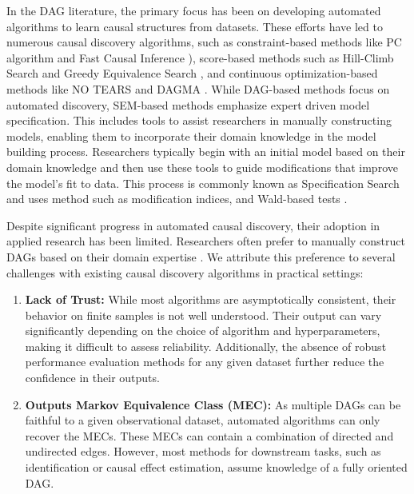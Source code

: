\documentclass{uai2025} %
\begin{document}
In the DAG literature, the primary focus has been on developing automated
algorithms to learn causal structures from datasets. These efforts have led to
numerous causal discovery algorithms, such as constraint-based methods like PC
algorithm \citep{Spirtes2001} and Fast Causal Inference \citep{Spirtes2000}),
score-based methods such as Hill-Climb Search and Greedy Equivalence Search
\citep{Chickering2002}, and continuous optimization-based methods like NO TEARS
\citep{Zheng2018} and DAGMA \citep{Bello2022}. While DAG-based methods focus on
automated discovery, SEM-based methods emphasize expert driven model
specification. This includes tools to assist researchers in manually
constructing models, enabling them to incorporate their domain knowledge in the
model building process. Researchers typically begin with an initial model based
on their domain knowledge and then use these tools to guide modifications that
improve the model's fit to data. This process is commonly known as
Specification Search \citep{Long1983} and uses method such as modification
indices, and Wald-based tests \citep{Marcoulides2018}. 

Despite significant progress in automated causal discovery, their adoption in
applied research has been limited. Researchers often prefer to manually
construct DAGs based on their domain expertise \citep{Tennant2020,
Petersen2021}. We attribute this preference to several challenges with existing
causal discovery algorithms in practical settings:

\begin{enumerate}
	\item \textbf{Lack of Trust:} While most algorithms are asymptotically
		consistent, their behavior on finite samples is not well
		understood. Their output can vary significantly depending on
		the choice of algorithm and hyperparameters, making it
		difficult to assess reliability. Additionally, the absence of
		robust performance evaluation methods for any given dataset
		further reduce the confidence in their outputs. 
	\item \textbf{Outputs Markov Equivalence Class (MEC):} As multiple
		DAGs can be faithful to a given observational dataset, automated 
		algorithms can only recover the MECs. These MECs can contain a
		combination of directed and undirected edges. However, most
		methods for downstream tasks, such as identification or causal
		effect estimation, assume knowledge of a fully oriented DAG. 
\end{enumerate}
\end{document}
